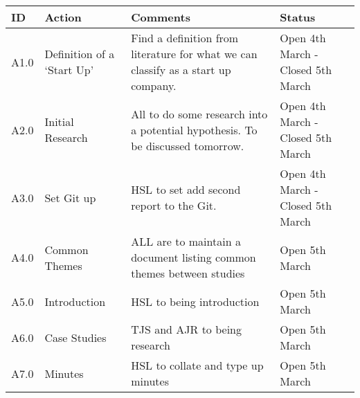 \begin{center}
\begin{longtable}{| p{} | >{\raggedright\arraybackslash}p{} |  p{} | >{\raggedright\arraybackslash}p{}|} \hline
\textbf{ID} & \textbf{Action} & \textbf{Comments} & \textbf{Status} \\ \hline
\endhead
A1.0	&	Definition of a `Start Up'	&	Find a definition from literature for what we can classify as a start up company.	& Open 4th March - Closed 5th March \\ \hline
A2.0	&	Initial Research	&	All to do some research into a potential hypothesis. To be discussed tomorrow.	&	Open 4th March - Closed 5th March\\ \hline
A3.0	&	Set Git up	&	HSL to set add second report to the Git.	&	Open 4th March	- Closed 5th March\\ \hline	
A4.0	&	Common Themes	&	ALL are to maintain a document listing common themes between studies & Open 5th March \\ \hline
A5.0	&	Introduction	&	HSL to being introduction	&	Open 5th March \\ \hline
A6.0	&	Case Studies	&	TJS and AJR to being research & Open 5th March \\ \hline
A7.0	&	Minutes		& 	HSL to collate and type up minutes & Open 5th March \\ \hline
\end{longtable}
\end{center}


